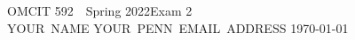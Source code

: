 \documentclass[11pt]{article}
\newcommand{\E}{\mbox{E}}
\newcommand{\HomeworkNo}{2}
\begin{document}
\thispagestyle{firstpage}
\begin{center}
{\Large OMCIT 592~~Spring 2022\hfill Exam \HomeworkNo}\\[20pt]
























\mbox{YOUR NAME}
\hfill
\mbox{YOUR PENN EMAIL ADDRESS}
\hfill
\mbox{\today}
\end{center}

\vspace*{1cm}
\end{document}
